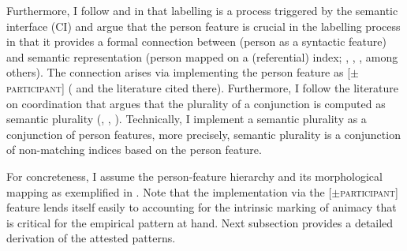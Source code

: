 \documentclass[output=paper,modfontsnewtxmath,hidelinks]{langscibook}
\begin{document}
Furthermore, I follow \citet{Narita2011} and \citet{Chomsky2013} in that labelling is a process triggered by the semantic interface (CI) and argue that the person feature is crucial in the labelling process in that it provides a formal connection between  (person as a syntactic feature) and semantic representation (person mapped on a (referential) index; \citealt{Longobardi2008}, \citealt{Sudo2012}, \citealt{Landau2010}, among others). The connection arises via implementing the person feature as [$\pm$\textsc{participant}] (\cite{Nevins2007} and the literature cited there). Furthermore, I follow the literature on coordination that argues that the plurality of a  conjunction is computed as semantic plurality (\citealt{Munn1993}, \citealt{Bošković2009}, \citealt{bhattwalkow13}). Technically, I implement a semantic plurality as a conjunction of person features, more precisely, semantic plurality is a conjunction of non-matching indices based on the person feature. 

For concreteness, I assume the person-feature hierarchy and its morphological mapping as exemplified in . 
Note that the implementation via the [$\pm$\textsc{participant}] feature lends itself easily to accounting for the intrinsic marking of animacy that is critical for the empirical pattern at hand. Next subsection provides a detailed derivation of the attested patterns.
\end{document}
